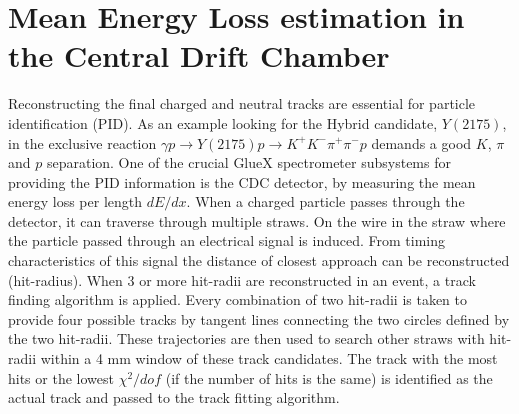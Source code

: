 \section{Mean Energy Loss estimation in the Central Drift Chamber}
\label{p3}

Reconstructing the final charged and neutral tracks are essential for particle identification (PID). As an example looking for the Hybrid candidate, $Y(2175)$, in the exclusive reaction $\gamma p \rightarrow Y(2175) p \rightarrow K^{+}K^{-}\pi^{+}\pi^{-}p$ demands a good $K$, $\pi$ and $p$ separation. One of the crucial GlueX spectrometer subsystems for providing the PID information is the CDC detector, by measuring the mean energy loss per length $dE/dx$.
When a charged particle passes through the detector, it can traverse through multiple straws. On the wire in the straw where the particle passed through an electrical signal is induced. From timing characteristics of this signal the distance of closest approach can be reconstructed (hit-radius). When 3 or more hit-radii are reconstructed in an event, a track finding algorithm is applied. Every combination of two hit-radii is taken to provide four possible tracks by tangent lines connecting the two circles defined by the two hit-radii. These trajectories are then used to search other straws with hit-radii within a 4 mm window of these track candidates. The track with the most hits or the lowest $\chi^{2}/dof$ (if the number of hits is the same) is identified as the actual track and passed to the track fitting algorithm.

